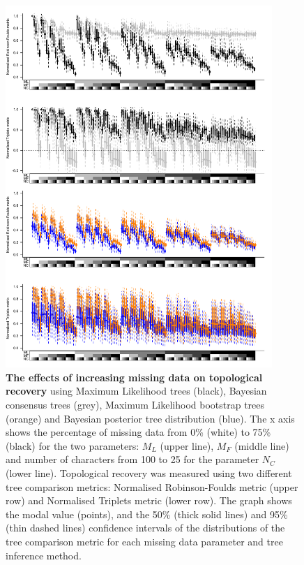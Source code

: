 \begin{figure}[!ht]
\centering
    \includegraphics[width=0.9\textwidth]{TEM/Figures/Fig5_with_appendix.pdf}
\caption[Effects of increasing missing data on topological recovery with parameters combination]{\textbf{The effects of increasing missing data on topological recovery} using Maximum Likelihood trees (black), Bayesian consensus trees (grey), Maximum Likelihood bootstrap trees (orange) and Bayesian posterior tree distribution (blue). The x axis shows the percentage of missing data from 0\% (white) to 75\% (black) for the two parameters: $M_{L}$ (upper line), $M_{F}$ (middle line) and number of characters from 100 to 25 for the parameter $N_{C}$ (lower line). Topological recovery was measured using two different tree comparison metrics: Normalised Robinson-Foulds metric (upper row) and Normalised Triplets metric (lower row). The graph shows the modal value (points), and the 50\% (thick solid lines) and 95\% (thin dashed lines) confidence intervals of the distributions of the tree comparison metric for each missing data parameter and tree inference method.} 
\label{Fig_Results-global_perparam}
\end{figure}

